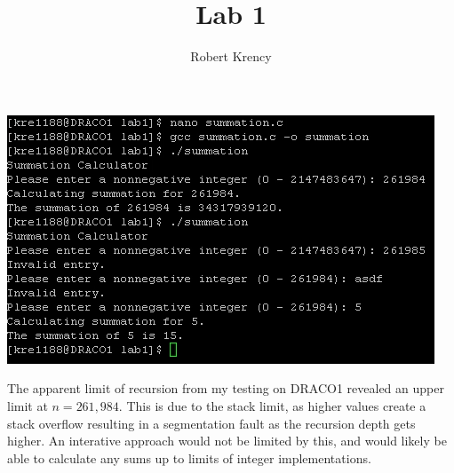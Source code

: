 \documentclass{article}
\date{}
\author{Robert Krency}
\title{Lab 1}
\begin{document}
\maketitle
\thispagestyle{fancy}

\begin{center}
    \includegraphics{screenshot.png}    
\end{center}

The apparent limit of recursion from my testing on DRACO1 revealed an upper limit at $n=261,984$.
This is due to the stack limit, as higher values create a stack overflow resulting in a segmentation fault as the recursion depth gets higher.
An interative approach would not be limited by this, and would likely be able to calculate any sums up to limits of integer implementations.
\end{document}
